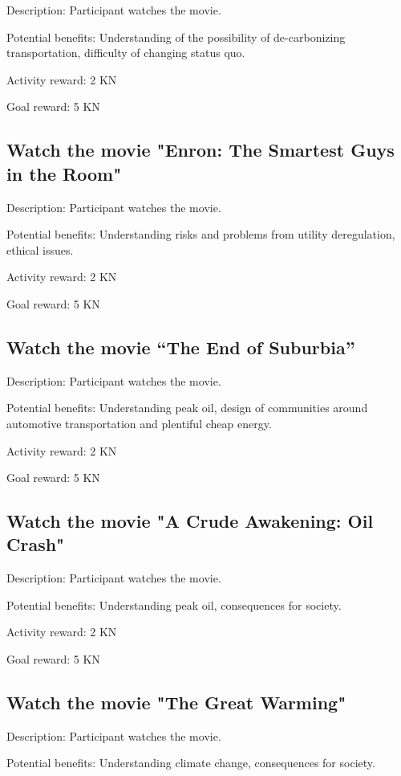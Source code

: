 Description: Participant watches the movie.

Potential benefits: Understanding of the possibility of de-carbonizing transportation, difficulty of changing status quo.

Activity reward: 2 KN

Goal reward: 5 KN

\subsection{Watch the movie "Enron: The Smartest Guys in the Room"}

Description: Participant watches the movie.

Potential benefits: Understanding risks and problems from utility deregulation, ethical issues.

Activity reward: 2 KN

Goal reward: 5 KN

\subsection[Watch the movie ``The End of Suburbia'']{Watch the movie ``The End of Suburbia''}

Description: Participant watches the movie.

Potential benefits: Understanding peak oil, design of communities around automotive transportation and plentiful cheap energy.

Activity reward: 2 KN

Goal reward: 5 KN

\subsection{Watch the movie "A Crude Awakening: Oil Crash"}

Description: Participant watches the movie.

Potential benefits: Understanding peak oil, consequences for society.

Activity reward: 2 KN

Goal reward: 5 KN

\subsection{Watch the movie "The Great Warming"}

Description: Participant watches the movie.

Potential benefits: Understanding climate change, consequences for society.

